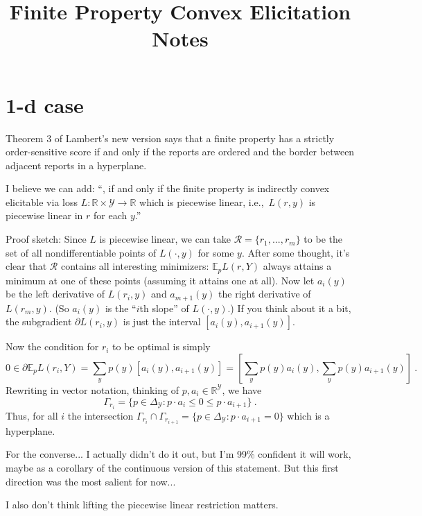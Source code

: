 \documentclass[12pt]{article}
\title{Finite Property Convex Elicitation Notes}
\newcommand{\reals}{\mathbb{R}}
\newcommand{\E}{\mathbb{E}}
\newcommand{\R}{\mathcal{R}}
\newcommand{\Y}{\mathcal{Y}}
\begin{document}
\maketitle

\section{1-d case}

Theorem 3 of Lambert's new version says that a finite property has a strictly order-sensitive score if and only if the reports are ordered and the border between adjacent reports in a hyperplane.

I believe we can add: ``, if and only if the finite property is indirectly convex elicitable via loss $L : \reals \times \Y \to \reals$ which is piecewise linear, i.e.,\ $L(r,y)$ is piecewise linear in $r$ for each $y$.''

Proof sketch: Since $L$ is piecewise linear, we can take $\R = \{r_1,...,r_m\}$ to be the set of all nondifferentiable points of $L(\cdot,y)$ for some $y$.
After some thought, it's clear that $\R$ contains all interesting minimizers: $\E_p L(r,Y)$ always attains a minimum at one of these points (assuming it attains one at all).
Now let $a_i(y)$ be the left derivative of $L(r_i,y)$ and $a_{m+1}(y)$ the right derivative of $L(r_m,y)$.
(So $a_i(y)$ is the ``$i$th slope'' of $L(\cdot,y)$.)
If you think about it a bit, the subgradient $\partial L(r_i,y)$ is just the interval $[a_i(y), a_{i+1}(y)]$.

Now the condition for $r_i$ to be optimal is simply
\begin{equation*}\label{eq:1}
0 \in \partial \E_p L(r_i,Y) = \sum_y p(y) [a_i(y), a_{i+1}(y)] = \left[\sum_y p(y) a_i(y), \sum_y p(y) a_{i+1}(y)\right]~.
\end{equation*}
Rewriting in vector notation, thinking of $p,a_i \in \reals^\Y$, we have
\begin{equation*}\label{eq:1}
\Gamma_{r_i} = \{ p \in \Delta_\Y : p\cdot a_i \leq 0 \leq p\cdot a_{i+1} \}~.
\end{equation*}
Thus, for all $i$ the intersection $\Gamma_{r_i} \cap \Gamma_{r_{i+1}} = \{ p \in \Delta_\Y : p\cdot a_{i+1} = 0\}$ which is a hyperplane.

For the converse... I actually didn't do it out, but I'm 99\% confident it will work, maybe as a corollary of the continuous version of this statement.
But this first direction was the most salient for now...

I also don't think lifting the piecewise linear restriction matters.
\end{document}
